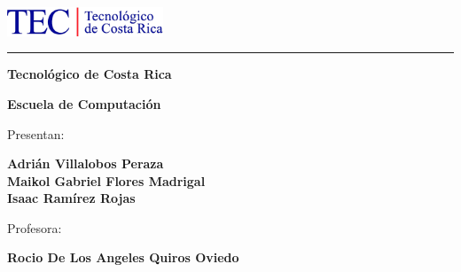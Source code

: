 \begin{titlepage}
    \begin{center}
    \includegraphics[width=0.35\textwidth]{Images/logo-tecnm}\hspace{0.2in}
    
    \rule[1.2cm]{\textwidth}{3pt}
    
    \vspace{-1cm}
    {\Huge
    \textbf{Tecnológico de Costa Rica}\vspace*{0.5cm}
	}
    
    \huge
    \textbf{Escuela de Computación}\vspace*{1cm}
        
        {\LARGE   
        \myTitle}
        \vspace*{3.5cm}
        

		{\Large
		 Presentan:    
	
			\textbf{Adrián Villalobos Peraza}\\
			\textbf{Maikol Gabriel Flores Madrigal}\\
            \textbf{Isaac Ramírez Rojas}\\
		}

        
         \vspace*{1.2cm}
         {\Large
        	Profesora:
        
    		\textbf{Rocio De Los Angeles Quiros Oviedo}\\
		}
    
    	\vspace{0.1in}

    \vfill
        
 
    
    {\Large \myDate}
    
    
    
    \end{center}
\end{titlepage}
